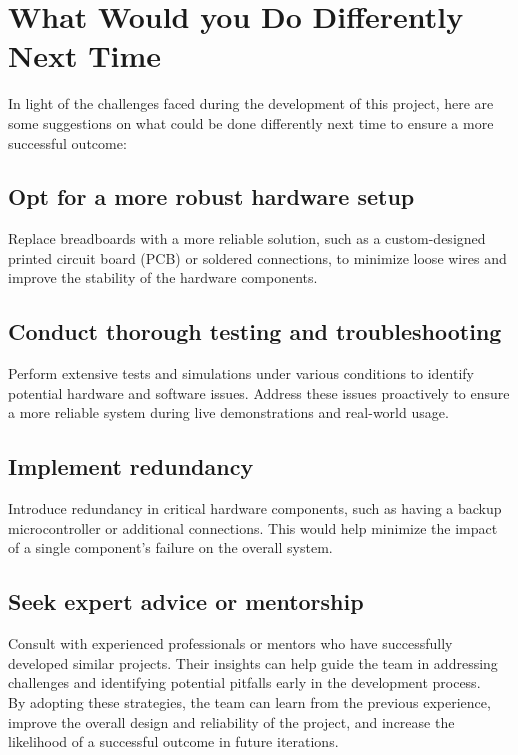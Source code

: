 \documentclass{article}
\begin{document}
\section{What Would you Do Differently Next Time}

In light of the challenges faced during the development of this project, here are some suggestions on what could be done differently next time to ensure a more successful outcome:

\subsection{Opt for a more robust hardware setup}
Replace breadboards with a more reliable solution, such as a custom-designed printed circuit board (PCB) or soldered connections, to minimize loose wires and improve the stability of the hardware components.

\subsection{Conduct thorough testing and troubleshooting}
Perform extensive tests and simulations under various conditions to identify potential hardware and software issues. Address these issues proactively to ensure a more reliable system during live demonstrations and real-world usage.

\subsection{Implement redundancy}
Introduce redundancy in critical hardware components, such as having a backup microcontroller or additional connections. This would help minimize the impact of a single component's failure on the overall system.

\subsection{Seek expert advice or mentorship}
Consult with experienced professionals or mentors who have successfully developed similar projects. Their insights can help guide the team in addressing challenges and identifying potential pitfalls early in the development process. \\ 

By adopting these strategies, the team can learn from the previous experience, improve the overall design and reliability of the project, and increase the likelihood of a successful outcome in future iterations.
\end{document}
